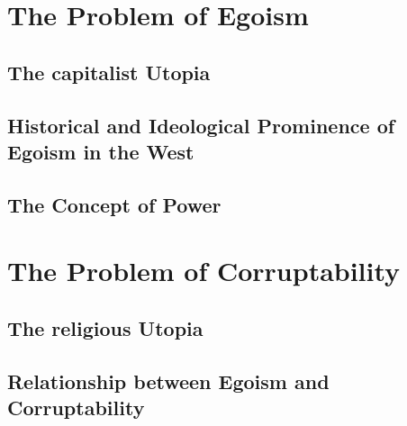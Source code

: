 \documentclass[12pt]{article}
\begin{document}
\section{The Problem of Egoism}
\subsection{The capitalist Utopia}
\subsection{Historical and Ideological Prominence of Egoism in the West}
\subsection{The Concept of Power}
\section{The Problem of Corruptability}
\subsection{The religious Utopia}
\subsection{Relationship between Egoism and Corruptability}
\end{document}
